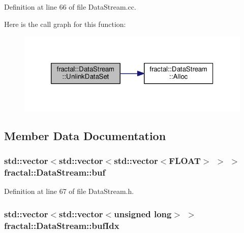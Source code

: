 Definition at line 66 of file Data\+Stream.\+cc.



Here is the call graph for this function\+:\nopagebreak
\begin{figure}[H]
\begin{center}
\leavevmode
\includegraphics[width=320pt]{de/d67/classfractal_1_1DataStream_abe96c80dcab04602d4b9139ecc4f70c0_cgraph}
\end{center}
\end{figure}




\subsection{Member Data Documentation}
\hypertarget{classfractal_1_1DataStream_aa606d09cd8ee4dc947ee5422b1d69921}{
\subsubsection[{buf}]{\setlength{\rightskip}{0pt plus 5cm}std\+::vector$<$std\+::vector$<$std\+::vector$<${\bf F\+L\+O\+A\+T}$>$ $>$ $>$ fractal\+::\+Data\+Stream\+::buf\hspace{0.3cm}{\ttfamily [protected]}}}\label{classfractal_1_1DataStream_aa606d09cd8ee4dc947ee5422b1d69921}


Definition at line 67 of file Data\+Stream.\+h.

\hypertarget{classfractal_1_1DataStream_aee8dc86b4b1f78b3ff93e3fb5bb7d009}{
\subsubsection[{buf\+Idx}]{\setlength{\rightskip}{0pt plus 5cm}std\+::vector$<$std\+::vector$<$unsigned long$>$ $>$ fractal\+::\+Data\+Stream\+::buf\+Idx\hspace{0.3cm}{\ttfamily [protected]}}}\label{classfractal_1_1DataStream_aee8dc86b4b1f78b3ff93e3fb5bb7d009}


